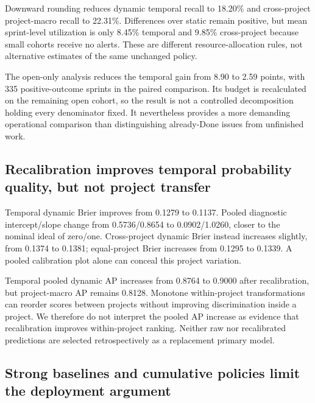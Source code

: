 Downward rounding reduces dynamic temporal recall to 18.20\% and cross-project project-macro recall to 22.31\%. Differences over static remain positive, but mean sprint-level utilization is only 8.45\% temporal and 9.85\% cross-project because small cohorts receive no alerts. These are different resource-allocation rules, not alternative estimates of the same unchanged policy.

The open-only analysis reduces the temporal gain from 8.90 to 2.59 points, with 335 positive-outcome sprints in the paired comparison. Its budget is recalculated on the remaining open cohort, so the result is not a controlled decomposition holding every denominator fixed. It nevertheless provides a more demanding operational comparison than distinguishing already-Done issues from unfinished work.

\subsection{Recalibration improves temporal probability quality, but not project transfer}\label{recalibration-improves-temporal-probability-quality-but-not-project-transfer}

{\def\LTcaptype{table}

}

Temporal dynamic Brier improves from 0.1279 to 0.1137. Pooled diagnostic intercept/slope change from 0.5736/0.8654 to 0.0902/1.0260, closer to the nominal ideal of zero/one. Cross-project dynamic Brier instead increases slightly, from 0.1374 to 0.1381; equal-project Brier increases from 0.1295 to 0.1339. A pooled calibration plot alone can conceal this project variation.

Temporal pooled dynamic AP increases from 0.8764 to 0.9000 after recalibration, but project-macro AP remains 0.8128. Monotone within-project transformations can reorder scores between projects without improving discrimination inside a project. We therefore do not interpret the pooled AP increase as evidence that recalibration improves within-project ranking. Neither raw nor recalibrated predictions are selected retrospectively as a replacement primary model.





\subsection{Strong baselines and cumulative policies limit the deployment argument}\label{strong-baselines-and-cumulative-policies-limit-the-deployment-argument}

